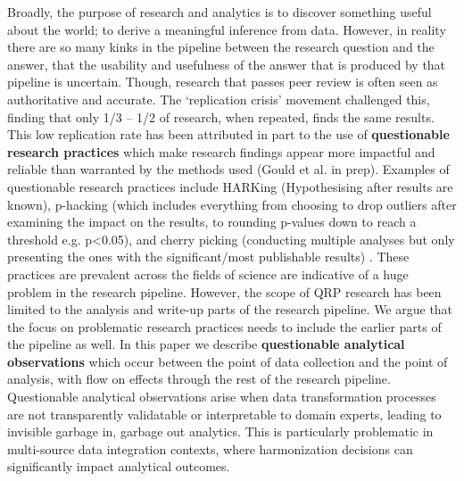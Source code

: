 \documentclass{article}
\begin{document}
Broadly, the purpose of research and analytics is to discover something useful about the world; to derive a meaningful inference from data. However, in reality there are so many kinks in the pipeline between the research question and the answer, that the usability and usefulness of the answer that is produced by that pipeline is uncertain. Though, research that passes peer review is often seen as authoritative and accurate. The ‘replication crisis’ movement challenged this, finding that only 1/3 – 1/2 of research, when repeated, finds the same results. This low replication rate has been attributed in part to the use of \textbf{questionable research practices} which make research findings appear more impactful and reliable than warranted by the methods used (Gould et al. in prep). Examples of questionable research practices include HARKing (Hypothesising after results are known), p-hacking (which includes everything from choosing to drop outliers after examining the impact on the results, to rounding p-values down to reach a threshold e.g. p<0.05), and cherry picking (conducting multiple analyses but only presenting the ones with the significant/most publishable results) \cite{john2012measuring}. These practices are prevalent across the fields of science \cite{xie2021prevalence} are indicative of a huge problem in the research pipeline. However, the scope of QRP research has been limited to the analysis and write-up parts of the research pipeline. We argue that the focus on problematic research practices needs to include the earlier parts of the pipeline as well. In this paper we describe \textbf{questionable analytical observations} which occur between the point of data collection and the point of analysis, with flow on effects through the rest of the research pipeline. Questionable analytical observations arise when data transformation processes are not transparently validatable or interpretable to domain experts, leading to invisible garbage in, garbage out analytics. This is particularly problematic in multi-source data integration contexts, where harmonization decisions can significantly impact analytical outcomes. 
\end{document}
